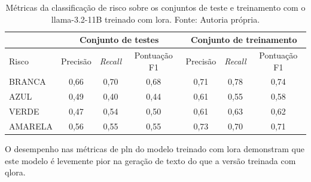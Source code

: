 \begin{table}[ht]
    \centering
    \begin{tabular}{l|c|c|c|c|c|c}
        \hline
                        & \multicolumn{3}{c|}{Conjunto de testes} & \multicolumn{3}{c}{Conjunto de treinamento}
        \\ \hline
        Risco           & Precisão                                & \textit{Recall}
                        & Pontuação F1                            & Precisão
                        &
        \textit{Recall} & Pontuação F1
        \\ \hline
        BRANCA          & 0,66                                    & 0,70                                        & 0,68
                        & 0,71                                    & 0,78                                        & 0,74
        \\
        AZUL            & 0,49                                    & 0,40                                        & 0,44
                        & 0,61                                    & 0,55                                        & 0,58
        \\
        VERDE           & 0,47                                    & 0,54                                        & 0,50
                        & 0,61                                    & 0,63                                        & 0,62
        \\
        AMARELA         & 0,56                                    & 0,55                                        & 0,55
                        & 0,73                                    & 0,70                                        & 0,71
        \\ \hline
    \end{tabular}
    \label{tab:lladerm_lora_risk_classification_report}
    \caption{Métricas da classificação de risco sobre os conjuntos de teste e treinamento com o
    \ac{llama}-3.2-11B treinado com \ac{lora}. Fonte: Autoria própria.}
\end{table}

O desempenho nas métricas de \ac{pln} do modelo treinado com \ac{lora} demonstram que este modelo é levemente pior na
geração de texto do que a versão treinada com \ac{qlora}.

\clearpage

